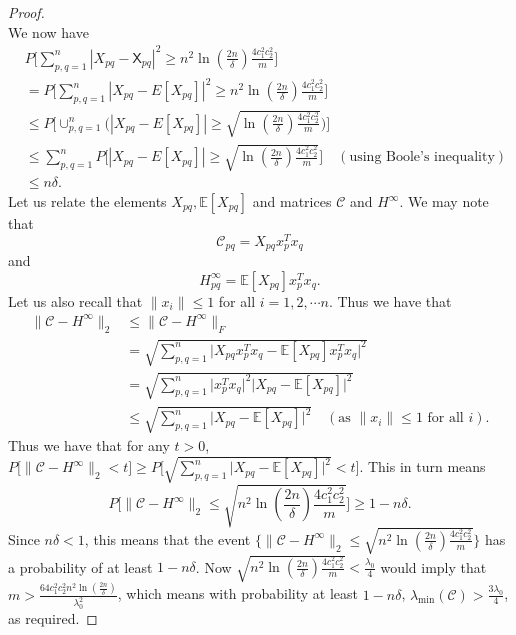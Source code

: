 \documentclass[a4paper,11pt]{amsart}
\newcommand{\IE}{\mathbb{E}}
\theoremstyle{definition}
\theoremstyle{plain}
\theoremstyle{remark}
\begin{document}
\begin{proof}
\[\]
We now have
\begin{equation*}
\begin{split}
&P\Big[\sum_{p,q=1}^n|X_{pq}-\mathsf{X}_{pq}|^2\geq n^2\ln(\frac{2n}{\delta})\frac{4c_1^2c_2^2}{m}\Big]\\
&=P\Big[\sum_{p,q=1}^n|X_{pq}-E[X_{pq}]|^2\geq n^2\ln(\frac{2n}{\delta})\frac{4c_1^2c_2^2}{m}\Big]\\
&\leq P\Big[\cup_{p,q=1}^n\Big(|X_{pq}-E[X_{pq}]|\geq\sqrt{\ln(\frac{2n}{\delta})\frac{4c_1^2c_2^2}{m}}\Big)\Big]\\
&\leq\sum_{p,q=1}^nP\Big[|X_{pq}-E[X_{pq}]|\geq\sqrt{\ln(\frac{2n}{\delta})\frac{4c_1^2c_2^2}{m}}\Big]\quad(\text{using Boole's inequality})\\
&\leq n\delta.
\end{split}
\end{equation*}
Let us relate the elements $X_{pq},\IE[X_{pq}]$ and matrices $\mathcal{C}$ and $H^\infty$. We may note that \[\mathcal{C}_{pq}=X_{pq}x_p^Tx_q\] and \[H^\infty_{pq}=\IE[X_{pq}]x_p^Tx_q.\]
Let us also recall that $\|x_i\|\leq1$ for all $i=1,2,\cdots n$. Thus we have that 
\begin{equation*}
\begin{split}
\|\mathcal{C}-H^\infty\|_2&\leq\|\mathcal{C}-H^\infty\|_F\\
&=\sqrt{\sum_{p,q=1}^n\Big|X_{pq}x_p^Tx_q-\IE[X_{pq}]x_p^Tx_q\Big|^2}\\
&=\sqrt{\sum_{p,q=1}^n\Big|x_p^Tx_q\Big|^2\Big|X_{pq}-\IE[X_{pq}]\Big|^2}\\
&\leq\sqrt{\sum_{p,q=1}^n\Big|X_{pq}-\IE[X_{pq}]\Big|^2}\quad(\text{as $\|x_i\|\leq1$ for all $i$}).
\end{split}
\end{equation*}
Thus we have that for any $t>0$, $P\Big[\|\mathcal{C}-H^\infty\|_2<t\Big]\geq P\Big[\sqrt{\sum_{p,q=1}^n\Big|X_{pq}-\IE[X_{pq}]\Big|^2}<t\Big]$.
This in turn means \[
P\Big[\|\mathcal{C}-H^\infty\|_2\leq\sqrt{n^2\ln(\frac{2n}{\delta})\frac{4c_1^2c_2^2}{m}}\Big]\geq 1-n\delta. 
\]
Since $n\delta<1$, this means that the event $\Big\{\|\mathcal{C}-H^\infty\|_2\leq\sqrt{n^2\ln(\frac{2n}{\delta})\frac{4c_1^2c_2^2}{m}}\Big\}$ has a probability of at least $1-n\delta$. Now $\sqrt{n^2\ln(\frac{2n}{\delta})\frac{4c_1^2c_2^2}{m}}<\frac{\lambda_0}{4}$ would imply that $m>\frac{64c_1^2c_2^2n^2\ln(\frac{2n}{\delta})}{\lambda_0^2}$, which means with probability at least $1-n\delta$, $\lambda_{\min}(\mathcal{C})>\frac{3\lambda_0}{4}$, as required.
\end{proof}
\end{document}
